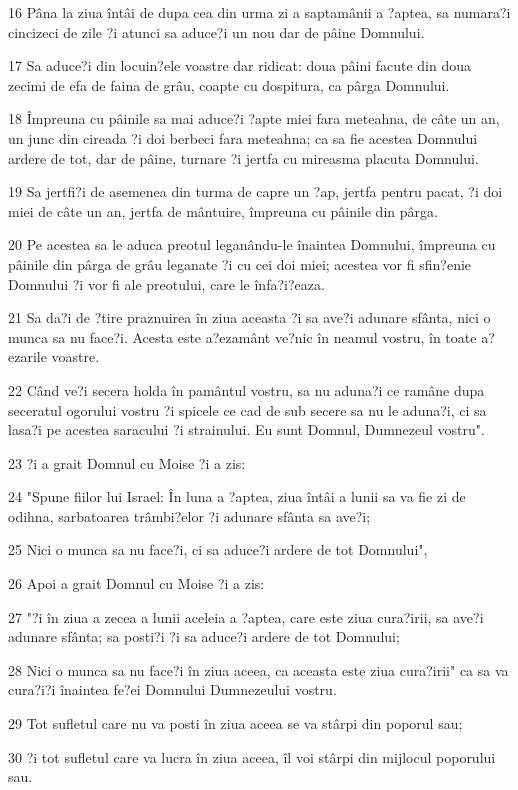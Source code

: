 \par 16 Pâna la ziua întâi de dupa cea din urma zi a saptamânii a ?aptea, sa numara?i cincizeci de zile ?i atunci sa aduce?i un nou dar de pâine Domnului.
\par 17 Sa aduce?i din locuin?ele voastre dar ridicat: doua pâini facute din doua zecimi de efa de faina de grâu, coapte cu dospitura, ca pârga Domnului.
\par 18 Împreuna cu pâinile sa mai aduce?i ?apte miei fara meteahna, de câte un an, un junc din cireada ?i doi berbeci fara meteahna; ca sa fie acestea Domnului ardere de tot, dar de pâine, turnare ?i jertfa cu mireasma placuta Domnului.
\par 19 Sa jertfi?i de asemenea din turma de capre un ?ap, jertfa pentru pacat, ?i doi miei de câte un an, jertfa de mântuire, împreuna cu pâinile din pârga.
\par 20 Pe acestea sa le aduca preotul leganându-le înaintea Domnului, împreuna cu pâinile din pârga de grâu leganate ?i cu cei doi miei; acestea vor fi sfin?enie Domnului ?i vor fi ale preotului, care le înfa?i?eaza.
\par 21 Sa da?i de ?tire praznuirea în ziua aceasta ?i sa ave?i adunare sfânta, nici o munca sa nu face?i. Acesta este a?ezamânt ve?nic în neamul vostru, în toate a?ezarile voastre.
\par 22 Când ve?i secera holda în pamântul vostru, sa nu aduna?i ce ramâne dupa seceratul ogorului vostru ?i spicele ce cad de sub secere sa nu le aduna?i, ci sa lasa?i pe acestea saracului ?i strainului. Eu sunt Domnul, Dumnezeul vostru".
\par 23 ?i a grait Domnul cu Moise ?i a zis:
\par 24 "Spune fiilor lui Israel: În luna a ?aptea, ziua întâi a lunii sa va fie zi de odihna, sarbatoarea trâmbi?elor ?i adunare sfânta sa ave?i;
\par 25 Nici o munca sa nu face?i, ci sa aduce?i ardere de tot Domnului",
\par 26 Apoi a grait Domnul cu Moise ?i a zis:
\par 27 "?i în ziua a zecea a lunii aceleia a ?aptea, care este ziua cura?irii, sa ave?i adunare sfânta; sa posti?i ?i sa aduce?i ardere de tot Domnului;
\par 28 Nici o munca sa nu face?i în ziua aceea, ca aceasta este ziua cura?irii" ca sa va cura?i?i înaintea fe?ei Domnului Dumnezeului vostru.
\par 29 Tot sufletul care nu va posti în ziua aceea se va stârpi din poporul sau;
\par 30 ?i tot sufletul care va lucra în ziua aceea, îl voi stârpi din mijlocul poporului sau.
